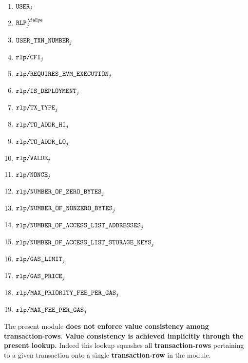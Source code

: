 \begin{description}
\begin{multicols}{2}
			\begin{enumerate}
				\item $\texttt{USER}                                    _{j}$
				\item $\isUserTxnRlpView                        _{j}$
				\item $\texttt{USER}\texttt{\_}\texttt{TXN\_NUMBER}                   _{j}$
				\item $\texttt{rlp}\texttt{/}{\texttt{\texttt{CFI}}}                           _{j}$
				\item $\texttt{rlp}\texttt{/}{\texttt{\texttt{REQUIRES\_EVM\_EXECUTION}}}          _{j}$
				\item $\texttt{rlp}\texttt{/}{\texttt{IS\_DEPLOYMENT}}                         _{j}$
				\item $\texttt{rlp}\texttt{/}{\texttt{TX\_TYPE}}                        _{j}$
				\item $\texttt{rlp}\texttt{/}{\texttt{TO\_ADDR\_HI}}                      _{j}$
				\item $\texttt{rlp}\texttt{/}{\texttt{TO\_ADDR\_LO}}                      _{j}$
				\item $\texttt{rlp}\texttt{/}{\texttt{VALUE}}                         _{j}$
				\item $\texttt{rlp}\texttt{/}{\texttt{NONCE}}                         _{j}$
				\item $\texttt{rlp}\texttt{/}{\texttt{NUMBER\_OF\_ZERO\_BYTES}}             _{j}$
				\item $\texttt{rlp}\texttt{/}{\texttt{NUMBER\_OF\_NONZERO\_BYTES}}          _{j}$
				\item $\texttt{rlp}\texttt{/}{\texttt{NUMBER\_OF\_ACCESS\_LIST\_ADDRESSES}}   _{j}$
				\item $\texttt{rlp}\texttt{/}{\texttt{NUMBER\_OF\_ACCESS\_LIST\_STORAGE\_KEYS}} _{j}$
				\item $\texttt{rlp}\texttt{/}{\texttt{GAS\_LIMIT}}                      _{j}$
				\item $\texttt{rlp}\texttt{/}{\texttt{GAS\_PRICE}}                      _{j}$
				\item $\texttt{rlp}\texttt{/}{\texttt{MAX\_PRIORITY\_FEE\_PER\_GAS}}          _{j}$
				\item $\texttt{rlp}\texttt{/}{\texttt{MAX\_FEE\_PER\_GAS}}                  _{j}$
			\end{enumerate} 
		\end{multicols}
\end{description}
\saNote{}
The present module \textbf{does not enforce value consistency among transaction-rows}.
\textbf{Value consistency is achieved implicitly through the present lookup.}
Indeed this lookup squashes all \textbf{transaction-rows} pertaining to a given transaction
onto a single \textbf{transaction-row} in the \rlpTxnMod{} module.
